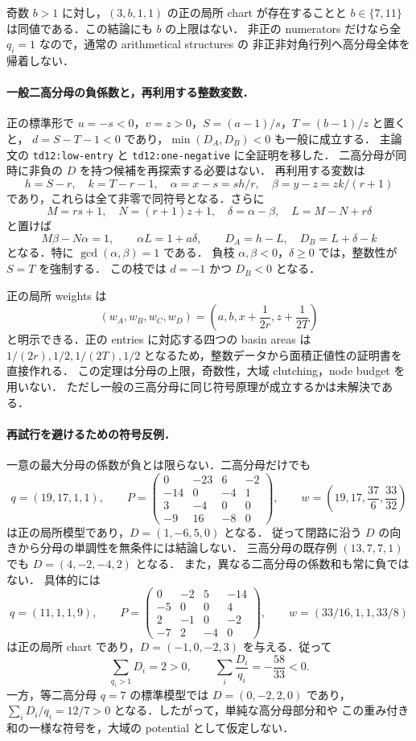 奇数 $b>1$ に対し，$(3,b,1,1)$ の正の局所 chart が存在することと
$b\in\{7,11\}$ は同値である．この結論にも $b$ の上限はない．
非正の numerators だけなら全 $q_i=1$ なので，通常の arithmetical structures の
非正非対角行列\cite[\S\S1--3]{CorralesValencia}へ高分母全体を帰着しない．

\paragraph{一般二高分母の負係数と，再利用する整数変数．}
正の標準形で $u=-s<0$，$v=z>0$，$S=(a-1)/s$，$T=(b-1)/z$ と置くと，
$d=S-T-1<0$ であり，$\min(D_A,D_B)<0$ も一般に成立する．
主論文の \texttt{td12:low-entry} と \texttt{td12:one-negative} に全証明を移した．
二高分母が同時に非負の $D$ を持つ候補を再探索する必要はない．
再利用する変数は
\[
 h=S-r,\quad k=T-r-1,\quad
 \alpha=x-s=sh/r,\quad \beta=y-z=zk/(r+1)
\]
であり，これらは全て非零で同符号となる．さらに
\[
 M=rs+1,\quad N=(r+1)z+1,\quad
 \delta=\alpha-\beta,\quad L=M-N+r\delta
\]
と置けば
\[
 M\beta-N\alpha=1,\qquad \alpha L=1+a\delta,
 \qquad D_A=h-L,\quad D_B=L+\delta-k
\]
となる．特に $\gcd(\alpha,\beta)=1$ である．
負枝 $\alpha,\beta<0$，$\delta\geq0$ では，整数性が $S=T$ を強制する．
この枝では $d=-1$ かつ $D_B<0$ となる．

正の局所 weights は
\[
 (w_A,w_B,w_C,w_D)
 =\left(a,b,x+\frac1{2r},z+\frac1{2T}\right)
\]
と明示できる．正の entries に対応する四つの basin areas は
$1/(2r),1/2,1/(2T),1/2$ となるため，整数データから面積正値性の証明書を直接作れる．
この定理は分母の上限，奇数性，大域 clutching，node budget を用いない．
ただし一般の三高分母に同じ符号原理が成立するかは未解決である．

\paragraph{再試行を避けるための符号反例．}
一意の最大分母の係数が負とは限らない．二高分母だけでも
\[
 q=(19,17,1,1),\qquad
 P=\begin{pmatrix}
 0&-23&6&-2\\-14&0&-4&1\\3&-4&0&0\\-9&16&-8&0
 \end{pmatrix},\qquad
 w=\left(19,17,\frac{37}{6},\frac{33}{32}\right)
\]
は正の局所模型であり，$D=(1,-6,5,0)$ となる．
従って閉路に沿う $D$ の向きから分母の単調性を無条件には結論しない．
三高分母の既存例 $(13,7,7,1)$ でも $D=(4,-2,-4,2)$ となる．
また，異なる二高分母の係数和も常に負ではない．
具体的には
\[
 q=(11,1,1,9),\qquad
 P=\begin{pmatrix}
 0&-2&5&-14\\
 -5&0&0&4\\
 2&-1&0&-2\\
 -7&2&-4&0
 \end{pmatrix},\qquad
 w=(33/16,1,1,33/8)
\]
は正の局所 chart であり，$D=(-1,0,-2,3)$ を与える．従って
\[
 \sum_{q_i>1}D_i=2>0,\qquad
 \sum_i\frac{D_i}{q_i}=-\frac{58}{33}<0.
\]
一方，等二高分母 $q=7$ の標準模型では $D=(0,-2,2,0)$ であり，
$\sum_iD_i/q_i=12/7>0$ となる．したがって，単純な高分母部分和や
この重み付き和の一様な符号を，大域の potential として仮定しない．

